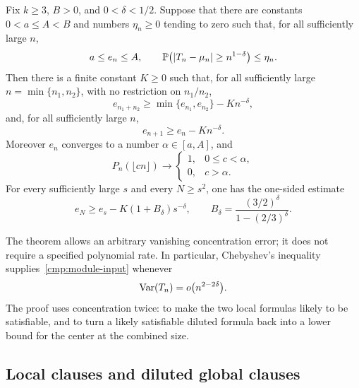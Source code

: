 \begin{theorem}
\label{thm:proper-center-module}\label{cmp:modular}
\label{cmp:centers}\label{cmp:convergence}
Fix $k\ge3$, $B>0$, and $0<\delta<1/2$.  Suppose that there are constants
$0<a\le A<B$ and numbers $\eta_n\ge0$ tending to zero such that, for all
sufficiently large $n$,
\begin{equation}\label{cmp:module-input}
 a\le e_n\le A,\qquad
 \mathbb P\bigl(|T_n-\mu_n|\ge n^{1-\delta}\bigr)\le\eta_n.
\end{equation}
Then there is a finite constant $K\ge0$ such that, for all sufficiently large
$n=\min\{n_1,n_2\}$, with no restriction on $n_1/n_2$,
\begin{equation}\label{cmp:sum}
 e_{n_1+n_2}\ge\min\{e_{n_1},e_{n_2}\}-K n^{-\delta},
\end{equation}
and, for all sufficiently large $n$,
\begin{equation}\label{cmp:neighbor}
 e_{n+1}\ge e_n-K n^{-\delta}.
\end{equation}
Moreover $e_n$ converges to a number $\alpha\in[a,A]$, and
\begin{equation}\label{cmp:strict-sides}
 P_n(\lfloor cn\rfloor)\longrightarrow
 \begin{cases}1,&0\le c<\alpha,\\0,&c>\alpha.\end{cases}
\end{equation}
For every sufficiently large $s$ and every $N\ge s^2$, one has the
one-sided estimate
\begin{equation}\label{cmp:tree-bound}
 e_N\ge e_s-K(1+B_\delta)s^{-\delta},\qquad
 B_\delta=\frac{(3/2)^\delta}{1-(2/3)^\delta}.
\end{equation}
\end{theorem}

The theorem allows an arbitrary vanishing concentration error; it does
not require a specified polynomial rate.  In particular, Chebyshev's
inequality supplies~\eqref{cmp:module-input} whenever
\begin{equation}\label{cmp:variance-input}
 \operatorname{Var}(T_n)=o\bigl(n^{2-2\delta}\bigr).
\end{equation}
The proof uses concentration twice: to make the two local formulas likely
to be satisfiable, and to turn a likely satisfiable diluted formula back
into a lower bound for the center at the combined size.

\subsection{Local clauses and diluted global clauses}

